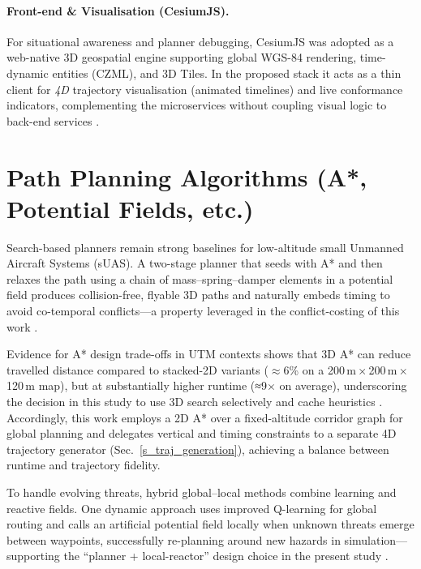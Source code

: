 \paragraph{Front-end \& Visualisation (CesiumJS).}
For situational awareness and planner debugging, CesiumJS was adopted as a web-native 3D geospatial engine supporting global WGS-84 rendering, time-dynamic entities (CZML), and 3D Tiles.  
In the proposed stack it acts as a thin client for \emph{4D} trajectory visualisation (animated timelines) and live conformance indicators, complementing the microservices without coupling visual logic to back-end services \cite{cesiumjs_docs}.



\section{Path Planning Algorithms (A*, Potential Fields, etc.)}%
\label{s_structure}

Search-based planners remain strong baselines for low-altitude small Unmanned Aircraft Systems (sUAS). A two-stage planner that seeds with A* and then relaxes the path using a chain of mass–spring–damper elements in a potential field produces collision-free, flyable 3D paths and naturally embeds timing to avoid co-temporal conflicts—a property leveraged in the conflict-costing of this work \cite{sahawneh2016_3d_path_planning}.

Evidence for A* design trade-offs in UTM contexts shows that 3D A* can reduce travelled distance compared to stacked-2D variants ($\approx$6\% on a 200\,m\,$\times$\,200\,m\,$\times$\,120\,m map), but at substantially higher runtime (≈9$\times$ on average), underscoring the decision in this study to use 3D search selectively and cache heuristics \cite{a_star_2d3d_comparison_utm}.  
Accordingly, this work employs a 2D A* over a fixed-altitude corridor graph for global planning and delegates vertical and timing constraints to a separate 4D trajectory generator (Sec.~\ref{s_traj_generation}), achieving a balance between runtime and trajectory fidelity.

To handle evolving threats, hybrid global–local methods combine learning and reactive fields. One dynamic approach uses improved Q-learning for global routing and calls an artificial potential field locally when unknown threats emerge between waypoints, successfully re-planning around new hazards in simulation—supporting the “planner + local-reactor” design choice in the present study \cite{uav_dynamic_path_planning_q_apf}.

